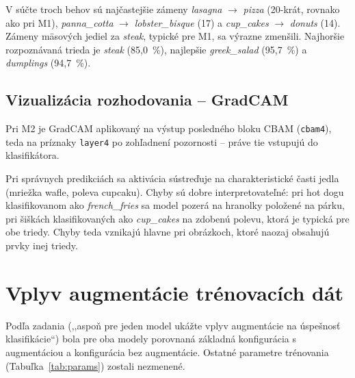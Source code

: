 
V súčte troch behov sú najčastejšie zámeny \emph{lasagna} $\rightarrow$
\emph{pizza} (20-krát, rovnako ako pri M1), \emph{panna\_cotta}
$\rightarrow$ \emph{lobster\_bisque} (17) a \emph{cup\_cakes}
$\rightarrow$ \emph{donuts} (14). Zámeny mäsových jediel za \emph{steak},
typické pre M1, sa výrazne zmenšili. Najhoršie rozpoznávaná trieda je
\emph{steak} (85,0~\%), najlepšie \emph{greek\_salad} (95,7~\%)
a \emph{dumplings} (94,7~\%).

\subsection{Vizualizácia rozhodovania -- GradCAM}

Pri M2 je GradCAM aplikovaný na výstup posledného bloku CBAM
(\texttt{cbam4}), teda na príznaky \texttt{layer4} po zohľadnení pozornosti --
práve tie vstupujú do klasifikátora.


Pri správnych predikciách sa aktivácia sústreďuje na charakteristické
časti jedla (mriežka wafle, poleva cupcaku). Chyby sú dobre
interpretovateľné: pri hot dogu klasifikovanom ako \emph{french\_fries}
sa model pozerá na hranolky položené na párku, pri šiškách
klasifikovaných ako \emph{cup\_cakes} na zdobenú polevu, ktorá je typická
pre obe triedy. Chyby teda vznikajú hlavne pri obrázkoch, ktoré naozaj
obsahujú prvky inej triedy.

\section{Vplyv augmentácie trénovacích dát}
\label{sec:augmentacia}

Podľa zadania (,,aspoň pre jeden model ukážte vplyv augmentácie na
úspešnosť klasifikácie``) bola pre oba modely porovnaná základná
konfigurácia s augmentáciou a konfigurácia bez augmentácie. Ostatné
parametre trénovania (Tabuľka~\ref{tab:params}) zostali nezmenené.

